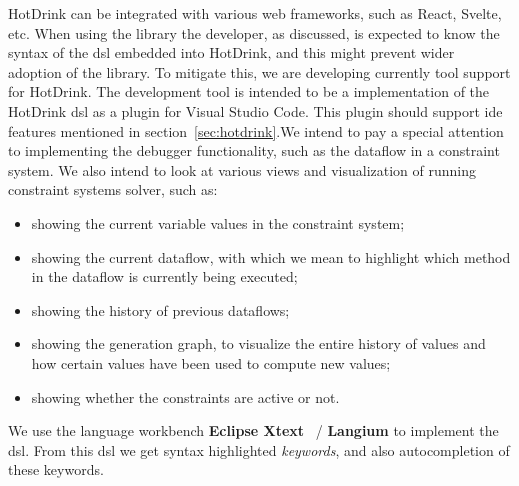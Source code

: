 HotDrink can be integrated with various web frameworks, such as React, Svelte, etc. When using the library the developer, as discussed, is expected to know the syntax of the \gls{dsl} embedded into HotDrink, and this might prevent wider adoption of the library. To mitigate this, we are developing currently tool support for HotDrink. The development tool is intended to be a implementation of the HotDrink \gls{dsl} as a plugin for Visual Studio Code. This plugin should support \gls{ide} features mentioned in section~\ref{sec:hotdrink}.We intend to pay a special attention to implementing the debugger functionality, such as 
the dataflow in a constraint system. We also intend to look at various views and 
visualization of running constraint systems solver, such as: 
\begin{itemize}
    \item showing the current variable values in the constraint system;
    \item showing the current dataflow, with which we mean to highlight which method in the dataflow is currently being executed;
    \item showing the history of previous dataflows;
    \item showing the generation graph, to visualize the entire history of values and how certain values have been used to compute new values;
    \item showing whether the constraints are active or not.
\end{itemize}

We use the language workbench \textbf{Eclipse Xtext}~\cite{eysholdt_xtext:_2010} / 
\textbf{Langium} to implement the \gls{dsl}. From this \gls{dsl} we get syntax 
highlighted \textit{keywords}, and also autocompletion of these keywords. 
